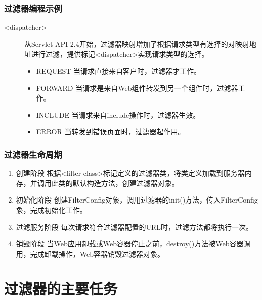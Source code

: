 \begin{frame}[fragile] %
\frametitle{过滤器编程示例} 

\begin{description}
\item[<dispatcher>] 
从Servlet API 2.4开始，过滤器映射增加了根据请求类型有选择的对映射地址进行过滤，提供标记<dispatcher>实现请求类型的选择。
\begin{itemize}\kai
\item REQUEST 当请求直接来自客户时，过滤器才工作。
\item FORWARD 当请求是来自Web组件转发到另一个组件时，过滤器工作。
\item INCLUDE 当请求来自include操作时，过滤器生效。
\item ERROR 当转发到错误页面时，过滤器起作用。
\end{itemize}
\end{description}
\end{frame}

\begin{frame}[fragile] %
\frametitle{过滤器生命周期} 

\begin{enumerate}\kai
\item {\hei\Blue 创建阶段} 根据<filter-class>标记定义的过滤器类，将类定义加载到服务器内存，并调用此类的默认构造方法，创建过滤器对象。
\item {\hei\Blue 初始化阶段} 创建FilterConfig对象，调用过滤器的init()方法，传入FilterConfig象，完成初始化工作。
\item {\hei\Blue 过滤服务阶段} 每次请求符合过滤器配置的URL时，过滤方法都将执行一次。
\item {\hei\Blue 销毁阶段} 当Web应用卸载或Web容器停止之前，destroy()方法被Web容器调用，完成卸载操作，Web容器销毁过滤器对象。
\end{enumerate}
\end{frame}

\section{过滤器的主要任务}

